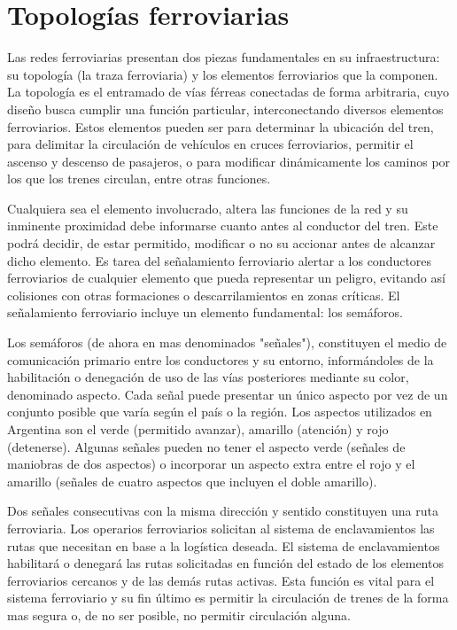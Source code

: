 \section{Topologías ferroviarias}

    Las redes ferroviarias presentan dos piezas fundamentales en su infraestructura: su topología (la traza ferroviaria) y los elementos ferroviarios que la componen. La topología es el entramado de vías férreas conectadas de forma arbitraria, cuyo diseño busca cumplir una función particular, interconectando diversos elementos ferroviarios. Estos elementos pueden ser para determinar la ubicación del tren, para delimitar la circulación de vehículos en cruces ferroviarios, permitir el ascenso y descenso de pasajeros, o para modificar dinámicamente los caminos por los que los trenes circulan, entre otras funciones.

    Cualquiera sea el elemento involucrado, altera las funciones de la red y su inminente proximidad debe informarse cuanto antes al conductor del tren. Este podrá decidir, de estar permitido, modificar o no su accionar antes de alcanzar dicho elemento. Es tarea del señalamiento ferroviario alertar a los conductores ferroviarios de cualquier elemento que pueda representar un peligro, evitando así colisiones con otras formaciones o descarrilamientos en zonas críticas. El señalamiento ferroviario incluye un elemento fundamental: los semáforos.

    Los semáforos (de ahora en mas denominados "señales"), constituyen el medio de comunicación primario entre los conductores y su entorno, informándoles de la habilitación o denegación de uso de las vías posteriores mediante su color, denominado aspecto. Cada señal puede presentar un único aspecto por vez de un conjunto posible que varía según el país o la región. Los aspectos utilizados en Argentina son el verde (permitido avanzar), amarillo (atención) y rojo (detenerse). Algunas señales pueden no tener el aspecto verde (señales de maniobras de dos aspectos) o incorporar un aspecto extra entre el rojo y el amarillo (señales de cuatro aspectos que incluyen el doble amarillo).
    
    Dos señales consecutivas con la misma dirección y sentido constituyen una ruta ferroviaria. Los operarios ferroviarios solicitan al sistema de enclavamientos las rutas que necesitan en base a la logística deseada. El sistema de enclavamientos habilitará o denegará las rutas solicitadas en función del estado de los elementos ferroviarios cercanos y de las demás rutas activas. Esta función es vital para el sistema ferroviario y su fin último es permitir la circulación de trenes de la forma mas segura o, de no ser posible, no permitir circulación alguna.

    
    
    
    
    
